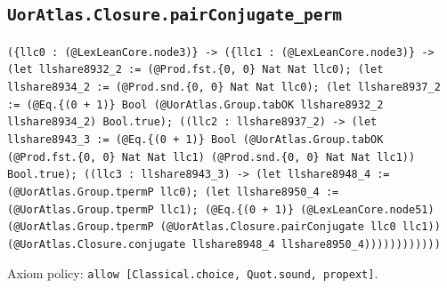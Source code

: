 \documentclass[11pt]{article}
\begin{document}
\subsection*{\texttt{UorAtlas.Closure.pairConjugate\_perm}}
\noindent\texttt{(\{llc0 : (@LexLeanCore.node3)\} -> (\{llc1 : (@LexLeanCore.node3)\} -> (let llshare8932\_2 := (@Prod.fst.\{0, 0\} Nat Nat llc0); (let llshare8934\_2 := (@Prod.snd.\{0, 0\} Nat Nat llc0); (let llshare8937\_2 := (@Eq.\{(0 + 1)\} Bool (@UorAtlas.Group.tabOK llshare8932\_2 llshare8934\_2) Bool.true); ((llc2 : llshare8937\_2) -> (let llshare8943\_3 := (@Eq.\{(0 + 1)\} Bool (@UorAtlas.Group.tabOK (@Prod.fst.\{0, 0\} Nat Nat llc1) (@Prod.snd.\{0, 0\} Nat Nat llc1)) Bool.true); ((llc3 : llshare8943\_3) -> (let llshare8948\_4 := (@UorAtlas.Group.tpermP llc0); (let llshare8950\_4 := (@UorAtlas.Group.tpermP llc1); (@Eq.\{(0 + 1)\} (@LexLeanCore.node51) (@UorAtlas.Group.tpermP (@UorAtlas.Closure.pairConjugate llc0 llc1)) (@UorAtlas.Closure.conjugate llshare8948\_4 llshare8950\_4))))))))))))}\par
\noindent Axiom policy: \texttt{allow [Classical.choice, Quot.sound, propext]}.\par
\end{document}
